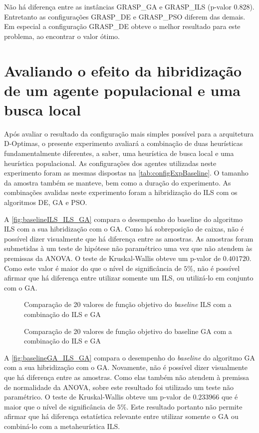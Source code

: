 Não há diferença entre as instâncias GRASP\_GA e GRASP\_ILS (p-valor 0.828). Entretanto as configurações GRASP\_DE e GRASP\_PSO diferem das demais. Em especial a configuração GRASP\_DE obteve o melhor resultado para este problema, ao encontrar o valor ótimo. 

\section{Avaliando o efeito da hibridização de um agente populacional e uma busca local}
\label{sec:popBuscaLocal}

Após avaliar o resultado da configuração mais simples possível para a arquitetura D-Optimas, o presente experimento avaliará a combinação de duas heurísticas fundamentalmente diferentes, a saber, uma heurística de busca local e uma heurística populacional. As configurações dos agentes utilizadas neste experimento foram as mesmas dispostas na \autoref{tab:configExpBaseline}. O tamanho da amostra também se manteve, bem como a duração do experimento. As combinações avalidas neste experimento foram a hibridização do ILS com os algoritmos DE, GA  e PSO.

A \autoref{fig:baselineILS_ILS_GA} compara o desempenho do baseline do algoritmo ILS com a sua hibridização com o GA. Como há sobreposição de caixas, não é possível dizer visualmente que há diferença entre as amostras. As amostras foram submetidas à um teste de hipótese não paramétrico uma vez que não atendem às premissas da ANOVA. O teste de Kruskal-Wallis obteve um p-valor de $0.401720$. Como este valor é maior do que o nível de significância de $5\%$, não é possível afirmar que há diferença entre utilizar somente um ILS, ou utilizá-lo em conjunto com o GA. 

\begin{figure}
    \centering
    
    \caption{Comparação de 20 valores de função objetivo do \textit{baseline} ILS com a combinação do ILS e GA}
    \label{fig:baselineILS_ILS_GA}
\end{figure}

\begin{figure}
    \centering
    
    \caption{Comparação de 20 valores de função objetivo do baseline GA com a combinação do ILS e GA}
    \label{fig:baselineGA_ILS_GA}
\end{figure}

A \autoref{fig:baselineGA_ILS_GA} compara o desempenho do \textit{baseline} do algoritmo GA com a sua hibridização com o GA. Novamente, não é possível dizer visualmente que há diferença entre as amostras. Como elas também não atendem à premissa de normalidade da ANOVA, sobre este resultado foi utilizado um teste não paramétrico. O teste de Kruskal-Wallis obteve um p-valor de $0.233966$ que é maior que o nível de significância de $5\%$. Este resultado portanto não permite afirmar que há diferença estatística relevante entre utilizar somente o GA ou combiná-lo com a metaheurística ILS.

